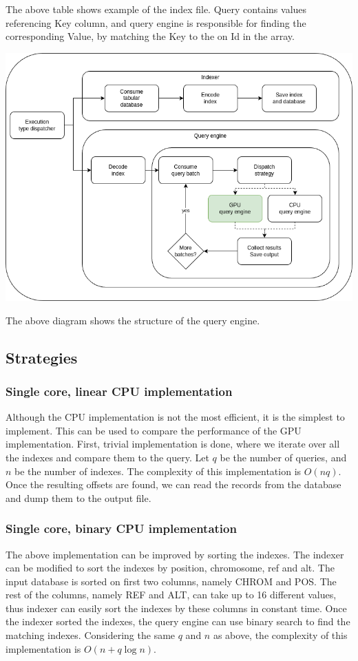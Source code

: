 \documentclass[a4paper,12pt]{article}
\begin{document}
    The above table shows example of the index file.
    Query contains values referencing Key column, and query engine is responsible for finding the corresponding Value,
    by matching the Key to the on Id in the array.

    \begin{center}
        \includegraphics[width=0.75\linewidth]{img/HPC-Cuda}
    \end{center}

    The above diagram shows the structure of the query engine.

    \subsection{Strategies}

    \subsubsection{Single core, linear CPU implementation}

    Although the CPU implementation is not the most efficient, it is the simplest to implement.
    This can be used to compare the performance of the GPU implementation.
    First, trivial implementation is done, where we iterate over all the indexes and compare them to the query.
    Let $q$ be the number of queries, and $n$ be the number of indexes.
    The complexity of this implementation is $O(n q)$.
    Once the resulting offsets are found, we can read the records from the database and
    dump them to the output file.

    \subsubsection{Single core, binary CPU implementation}

    The above implementation can be improved by sorting the indexes.
    The indexer can be modified to sort the indexes by position, chromosome, ref and alt.
    The input database is sorted on first two columns, namely CHROM and POS.
    The rest of the columns, namely REF and ALT, can take up to 16 different values,
    thus indexer can easily sort the indexes by these columns in constant time.
    Once the indexer sorted the indexes, the query engine can use binary search to find the matching indexes.
    Considering the same $q$ and $n$ as above, the complexity of this implementation is $O(n + q \log n)$.
\end{document}
